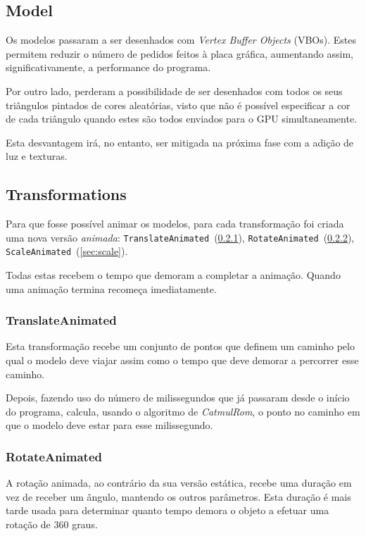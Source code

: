 \documentclass[a4paper]{article}
\begin{document}
\subsection{Model}

Os modelos passaram a ser desenhados com \textit{Vertex Buffer Objects} (VBOs). Estes permitem reduzir o número de pedidos feitos à placa gráfica, aumentando assim, significativamente, a performance do programa.

Por outro lado, perderam a possibilidade de ser desenhados com todos os seus triângulos pintados de cores aleatórias, visto que não é possível especificar a cor de cada triângulo quando estes são todos enviados para o GPU simultaneamente.

Esta desvantagem irá, no entanto, ser mitigada na próxima fase com a adição de luz e texturas.

\subsection{Transformations}

Para que fosse possível animar os modelos, para cada transformação foi criada uma nova versão \textit{animada}: \texttt{TranslateAnimated}~(\ref{sec:translate}), \texttt{RotateAnimated}~(\ref{sec:rotate}), \texttt{ScaleAnimated}~(\ref{sec:scale}).

Todas estas recebem o tempo que demoram a completar a animação. Quando uma animação termina recomeça imediatamente.

\subsubsection{TranslateAnimated}\label{sec:translate}

Esta transformação recebe um conjunto de pontos que definem um caminho pelo qual o modelo deve viajar assim como o tempo que deve demorar a percorrer esse caminho.

Depois, fazendo uso do número de milissegundos que já passaram desde o início do programa, calcula, usando o algoritmo de \textit{CatmulRom}, o ponto no caminho em que o modelo deve estar para esse milissegundo.

\subsubsection{RotateAnimated}\label{sec:rotate}

A rotação animada, ao contrário da sua versão estática, recebe uma duração em vez de receber um ângulo, mantendo os outros parâmetros. Esta duração é mais tarde usada para determinar quanto tempo demora o objeto a efetuar uma rotação de 360\degree{} graus.
\end{document}
